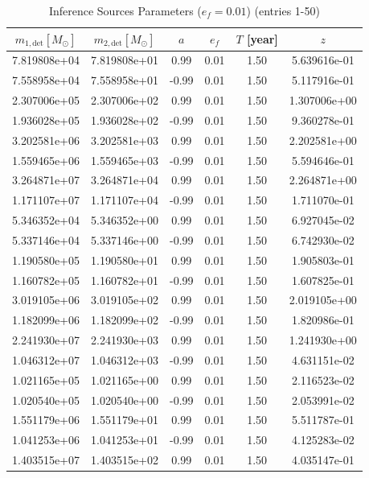 \documentclass{article}
\begin{document}
\begin{table}[htbp]
\centering
\caption{Inference Sources Parameters ($e_f=0.01$) (entries 1-50)}
\label{tab:inference_sources_ef01_1}
\begin{tabular}{cccccc}
\hline
$m_{1,\mathrm{det}} [M_\odot]$ & $m_{2,\mathrm{det}} [M_\odot]$ & $a$ & $e_f$ & $T$ [year] & $z$ \\
\hline
7.819808e+04 & 7.819808e+01 & 0.99 & 0.01 & 1.50 & 5.639616e-01 \\
7.558958e+04 & 7.558958e+01 & -0.99 & 0.01 & 1.50 & 5.117916e-01 \\
2.307006e+05 & 2.307006e+02 & 0.99 & 0.01 & 1.50 & 1.307006e+00 \\
1.936028e+05 & 1.936028e+02 & -0.99 & 0.01 & 1.50 & 9.360278e-01 \\
3.202581e+06 & 3.202581e+03 & 0.99 & 0.01 & 1.50 & 2.202581e+00 \\
1.559465e+06 & 1.559465e+03 & -0.99 & 0.01 & 1.50 & 5.594646e-01 \\
3.264871e+07 & 3.264871e+04 & 0.99 & 0.01 & 1.50 & 2.264871e+00 \\
1.171107e+07 & 1.171107e+04 & -0.99 & 0.01 & 1.50 & 1.711070e-01 \\
5.346352e+04 & 5.346352e+00 & 0.99 & 0.01 & 1.50 & 6.927045e-02 \\
5.337146e+04 & 5.337146e+00 & -0.99 & 0.01 & 1.50 & 6.742930e-02 \\
1.190580e+05 & 1.190580e+01 & 0.99 & 0.01 & 1.50 & 1.905803e-01 \\
1.160782e+05 & 1.160782e+01 & -0.99 & 0.01 & 1.50 & 1.607825e-01 \\
3.019105e+06 & 3.019105e+02 & 0.99 & 0.01 & 1.50 & 2.019105e+00 \\
1.182099e+06 & 1.182099e+02 & -0.99 & 0.01 & 1.50 & 1.820986e-01 \\
2.241930e+07 & 2.241930e+03 & 0.99 & 0.01 & 1.50 & 1.241930e+00 \\
1.046312e+07 & 1.046312e+03 & -0.99 & 0.01 & 1.50 & 4.631151e-02 \\
1.021165e+05 & 1.021165e+00 & 0.99 & 0.01 & 1.50 & 2.116523e-02 \\
1.020540e+05 & 1.020540e+00 & -0.99 & 0.01 & 1.50 & 2.053991e-02 \\
1.551179e+06 & 1.551179e+01 & 0.99 & 0.01 & 1.50 & 5.511787e-01 \\
1.041253e+06 & 1.041253e+01 & -0.99 & 0.01 & 1.50 & 4.125283e-02 \\
1.403515e+07 & 1.403515e+02 & 0.99 & 0.01 & 1.50 & 4.035147e-01 \\

\end{tabular}
\end{table}
\end{document}
